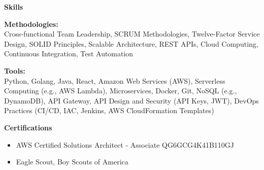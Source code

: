 \documentclass[10pt]{article}
\begin{document}
  \vspace{0.5em}
  {\large \textbf{Skills}}

  \begin{flushleft}
    \addtolength{\leftskip}{.3in}

    \textbf{Methodologies:}\\
    Cross-functional Team Leadership, SCRUM Methodologies, Twelve-Factor Service Design, SOLID Principles, Scalable Architecture, REST APIs, Cloud Computing, Continuous Integration, Test Automation

    \vspace{0.5em}

    \textbf{Tools:}\\
    Python, Golang, Java, React, Amazon Web Services (AWS), Serverless Computing (e.g., AWS Lambda), Microservices, Docker, Git, NoSQL (e.g., DynamoDB), API Gateway, API Design and Security (API Keys, JWT), DevOps Practices (CI/CD, IAC, Jenkins, AWS CloudFormation Templates)
  \end{flushleft}

  \vspace{0.5em}
  {\large \textbf{Certifications}}
  \begin{itemize}
      
      \item AWS Certified Solutions Architect - Associate QG6GCG4K41B110GJ
      
      \item Eagle Scout, Boy Scouts of America
      
  \end{itemize}
\end{document}
